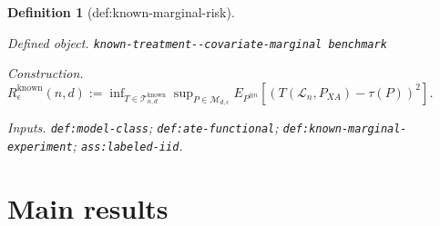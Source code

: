 \documentclass{article}
\newtheorem{definition}{Definition}
\begin{document}
\begin{definition}[def:known-marginal-risk]\label{def:known-marginal-risk}
\par\smallskip\noindent\emph{Defined object.} \texttt{known-\allowbreak{}treatment-\allowbreak{}-\allowbreak{}covariate-\allowbreak{}marginal benchmark}
\par\smallskip\noindent\emph{Construction.} \(R_\epsilon^{\mathrm{known}}(n,d):=\inf_{T\in\mathcal T^{\mathrm{known}}_{n,d}}\sup_{P\in\mathcal M_{d,\epsilon}}E_{P^{\otimes n}}[(T(\mathcal L_n,P_{XA})-\tau(P))^2]\).
\par\smallskip\noindent\emph{Inputs.} \texttt{def:\allowbreak{}model-\allowbreak{}class}; \texttt{def:\allowbreak{}ate-\allowbreak{}functional}; \texttt{def:\allowbreak{}known-\allowbreak{}marginal-\allowbreak{}experiment}; \texttt{ass:\allowbreak{}labeled-\allowbreak{}iid}.
\end{definition}

\section{Main results}
\end{document}
